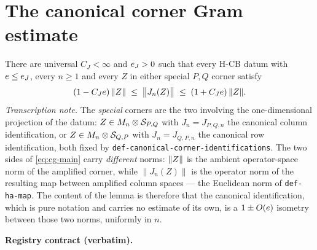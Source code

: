 \section{The canonical corner Gram estimate}\label{sec:hcb4-canonical-gram}

\begin{lemma}\label{lem:hcb4-canonical-gram}
There are universal $C_J<\infty$ and $e_J>0$ such that every H-CB datum with
$e\le e_J$, every $n\ge1$ and every $Z$ in either special $P,Q$ corner satisfy
\begin{equation}\label{eq:cg-main}
  (1-C_Je)\,\lVert Z\rVert\;\le\;\bigl\lVert J_n(Z)\bigr\rVert\;\le\;(1+C_Je)\,\lVert Z\rVert.
\end{equation}
\emph{Transcription note.} The \emph{special} corners are the two involving the
one-dimensional projection of the datum: $Z\in M_{n}\otimes \mathcal S_{P,Q}$ with $J_n=J_{P,Q,n}$
the canonical column identification, or $Z\in M_{n}\otimes \mathcal S_{Q,P}$ with $J_n=J_{Q,P,n}$ the
canonical row identification, both fixed by
\texttt{def-canonical-corner-identifications}. The two sides of \eqref{eq:cg-main} carry
\emph{different} norms: $\lVert Z\rVert$ is the ambient operator-space norm of the amplified
corner, while $\lVert J_n(Z)\rVert$ is the operator norm of the resulting map between
amplified column spaces --- the Euclidean norm of \texttt{def-ha-map}. The content of the
lemma is therefore that the canonical identification, which is pure notation and carries
no estimate of its own, is a $1\pm O(e)$ isometry between those two norms, uniformly
in $n$.
\end{lemma}

\noindent\textbf{Registry contract (verbatim).}

